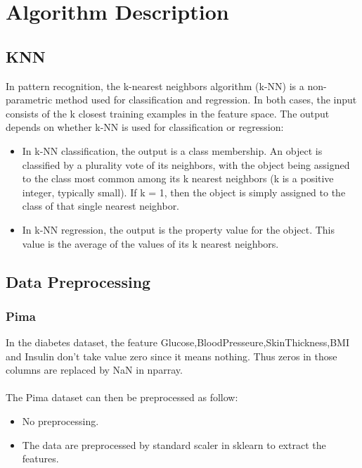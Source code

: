 \documentclass{article}
\begin{document}
\section{Algorithm Description}
\subsection{KNN}

In pattern recognition, the k-nearest neighbors algorithm (k-NN) is a non-parametric method used for classification and regression. In both cases, the input consists of the k closest training examples in the feature space. The output depends on whether k-NN is used for classification or regression:\\

\begin{itemize}
\item In k-NN classification, the output is a class membership. An object is classified by a plurality vote of its neighbors, with the object being assigned to the class most common among its k nearest neighbors (k is a positive integer, typically small). If k = 1, then the object is simply assigned to the class of that single nearest neighbor.\\
\item In k-NN regression, the output is the property value for the object. This value is the average of the values of its k nearest neighbors.\\
\end{itemize}

\subsection{Data Preprocessing}
\subsubsection{Pima}
In the diabetes dataset, the feature Glucose,BloodPresseure,SkinThickness,BMI and Insulin don't take value zero since it means nothing. Thus zeros in those columns are replaced by NaN in nparray. \\
\\
The Pima dataset can then be preprocessed as follow:
\begin{itemize} 
\item No preprocessing.
\item The data are preprocessed by standard scaler in sklearn to extract the features.
\end{itemize}
\end{document}
